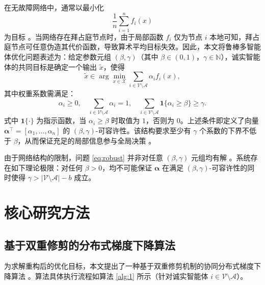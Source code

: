 在无故障网络中，通常以最小化 
\begin{equation}
\frac{1}{n}\sum_{i=1}^{n} f_i(x)
\end{equation}
为目标 \cite{tsianos2012, nedic2015}。当网络存在拜占庭节点时，由于局部函数 $f_i$ 仅为节点 $i$ 本地可知，拜占庭节点可任意伪造其代价函数，导致算术平均目标失效。因此，本文将鲁棒多智能体优化问题表述为：给定参数元组 $(\beta,\gamma)$（其中 $\beta\in(0,1)$，$\gamma\in\mathbb{N}$），诚实智能体的共同目标是确定一个输出 $\widetilde{x}$，使得
\begin{equation}
    \widetilde{x}\in\arg \min_{x\in\mathcal{X}} \sum_{i\in\mathcal{V}\setminus\mathcal{A}} \alpha_i f_i(x),
    \label{eq:robust}
\end{equation}
其中权重系数需满足：
\begin{equation}
    \alpha_i \ge 0,\quad \sum_{i\in\mathcal{V}\setminus\mathcal{A}} \alpha_i = 1,\quad
    \sum_{i\in\mathcal{V}\setminus\mathcal{A}} \mathbf{1}\{\alpha_i \ge \beta\} \ge \gamma .
    \label{eq:admissibility_condition}
\end{equation}
式中 $\mathbf{1}\{\cdot\}$ 为指示函数，当 $\alpha_i\ge\beta$ 时取值为 $1$，否则为 $0$。上述条件即定义了向量 $\boldsymbol{\alpha}^\top = [\alpha_1,\ldots,\alpha_n]$ 的 $(\beta,\gamma)$-可容许性。该结构要求至少有 $\gamma$ 个系数的下界不低于 $\beta$，从而保证充足的局部信息参与全局决策 \cite{charikar2017}。

由于网络结构的限制，问题 \eqref{eq:robust} 并非对任意 $(\beta,\gamma)$ 元组均有解 \cite{su2016limits}。系统存在如下理论极限：对任何 $\beta>0$，均不可能保证 $\boldsymbol{\alpha}$ 在满足 $(\beta,\gamma)$-可容许性的同时使得 $\gamma > |\mathcal{V}\setminus\mathcal{A}|-b$ 成立。

\section{核心研究方法}

\subsection{基于双重修剪的分布式梯度下降算法}
\quad \quad  为求解重构后的优化目标，本文提出了一种基于双重修剪机制的协同分布式梯度下降算法 \cite{su2021byzantine}。算法具体执行流程如算法 \ref{alg:1} 所示（针对诚实智能体 $i\in\mathcal{V}\setminus\mathcal{A}$）。

